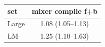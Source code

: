 \begin{tabular}{l c }
\toprule
set & mixer compile f+b \\
\midrule
Large & 1.08 (1.05--1.13) \\
LM & 1.25 (1.10--1.63) \\
\bottomrule
\end{tabular}
